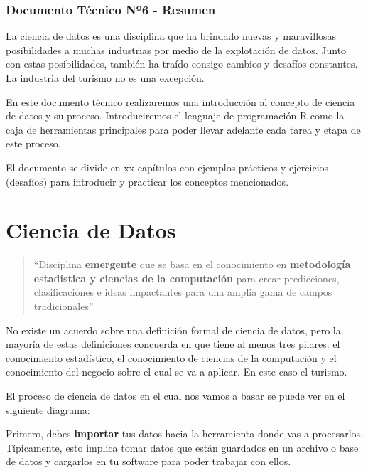 \documentclass[
  openany]{book}
\begin{document}
\hypertarget{documento-tuxe9cnico-nuxba6---resumen}{%
\subsection*{Documento Técnico Nº6 - Resumen}\label{documento-tuxe9cnico-nuxba6---resumen}}

La ciencia de datos es una disciplina que ha brindado nuevas y maravillosas posibilidades a muchas industrias por medio de la explotación de datos. Junto con estas posibilidades, también ha traído consigo cambios y desafíos constantes. La industria del turismo no es una excepción.

En este documento técnico realizaremos una introducción al concepto de ciencia de datos y su proceso. Introduciremos el lenguaje de programación R como la caja de herramientas principales para poder llevar adelante cada tarea y etapa de este proceso.

El documento se divide en xx capítulos con ejemplos prácticos y ejercicios (desafíos) para introducir y practicar los conceptos mencionados.

\hypertarget{ciencia-de-datos}{%
\chapter{Ciencia de Datos}\label{ciencia-de-datos}}

\begin{quote}
``Disciplina \textbf{emergente} que se basa en el conocimiento en \textbf{metodología estadística y ciencias de la computación} para crear predicciones, clasificaciones e ideas impactantes para una amplia gama de campos tradicionales''
\end{quote}

No existe un acuerdo sobre una definición formal de ciencia de datos, pero la mayoría de estas definiciones concuerda en que tiene al menos tres pilares: el conocimiento estadístico, el conocimiento de ciencias de la computación y el conocimiento del negocio sobre el cual se va a aplicar.
En este caso el turismo.

El proceso de ciencia de datos en el cual nos vamos a basar se puede ver en el siguiente diagrama:

Primero, debes \textbf{importar} tus datos hacia la herramienta donde vas a procesarlos.
Típicamente, esto implica tomar datos que están guardados en un archivo o base de datos y cargarlos en tu software para poder trabajar con ellos.
\end{document}
